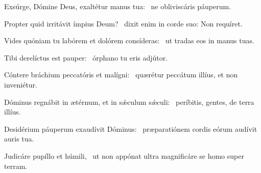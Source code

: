 \item Exsúrge, Dómine Deus, exaltétur manus tua:~\psstar{} ne obliviscáris páuperum.
\item Propter quid irritávit ímpius Deum?~\psstar{} dixit enim in corde suo: Non requíret.
\item Vides quóniam tu labórem et dolórem consíderas:~\psstar{} ut tradas eos in manus tuas.
\item Tibi derelíctus est pauper:~\psstar{} órphano tu eris adjútor.
\item Cóntere bráchium peccatóris et malígni:~\psstar{} quærétur peccátum illíus, et non inveniétur.
\item Dóminus regnábit in ætérnum, et in sǽculum sǽculi:~\psstar{} períbitis, gentes, de terra illíus.
\item Desidérium páuperum exaudívit Dóminus:~\psstar{} præparatiónem cordis eórum audívit auris tua.
\item Judicáre pupíllo et húmili,~\psstar{} ut non appónat ultra magnificáre se homo super terram.